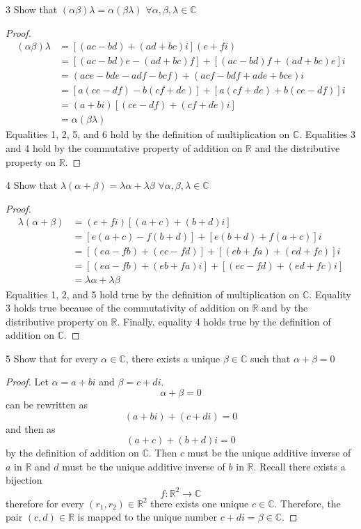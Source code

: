 \documentclass[12pt]{article}
\newenvironment{problem}[1]{\begin{prob*}{#1}{}}{\end{prob*}}
\begin{document}
\begin{problem}{3}
Show that $(\alpha\beta)\lambda =\alpha(\beta \lambda)$ $\forall \alpha,\beta,\lambda \in \mathbb{C}$
\end{problem}
\begin{proof}
    \begin{align*}
        (\alpha\beta)\lambda &=[(ac-bd)+(ad+bc)i](e+fi)\\
        &= [(ac-bd)e-(ad+bc)f]+[(ac-bd)f+(ad+bc)e]i\\
        &= (ace-bde-adf-bcf) +(acf-bdf+ade+bce)i\\
        &= [a(ce-df)-b(cf+de)]+[a(cf+de)+b(ce-df)]i\\
        &= (a+bi)[(ce-df)+(cf+de)i]\\
        &= \alpha(\beta\lambda) 
    \end{align*}
    Equalities 1, 2, 5, and 6 hold by the definition of multiplication on $\mathbb{C}$. Equalities 3 and 4 hold by the commutative property of addition on $\mathbb{R}$ and the distributive property on $\mathbb{R}$.
\end{proof}

\begin{problem}{4}
Show that $\lambda(\alpha + \beta) = \lambda\alpha + \lambda\beta$ $\forall \alpha, \beta, \lambda \in \mathbb{C}$
\end{problem}
\begin{proof}
    \begin{align*}
        \lambda(\alpha + \beta) &= (e+fi)[(a+c)+(b+d)i]\\
        &= [e(a+c)-f(b+d)]+[e(b+d)+f(a+c)]i\\
        &=[(ea-fb)+(ec-fd)]+[(eb+fa)+(ed+fc)]i\\
        &=[(ea-fb)+(eb+fa)i]+[(ec-fd)+(ed+fc)i]\\
        &=\lambda\alpha +\lambda\beta
    \end{align*}
    Equalities 1, 2, and 5 hold true by the definition of multiplication on $\mathbb{C}$.
    Equality 3 holds true because of the commutativity of addition on $\mathbb{R}$ and by the distributive property on $\mathbb{R}$. Finally, equality 4 holds true by the definition of addition on $\mathbb{C}$.
\end{proof}

\begin{problem}{5}
Show that for every $\alpha \in \mathbb{C}$, there exists a unique $\beta \in \mathbb{C}$ such that $\alpha + \beta =0$
\end{problem}
\begin{proof}
    Let $\alpha=a + bi$ and $\beta = c+di$. 
    \[\alpha + \beta =0\]
    can be rewritten as
    \[(a+bi)+(c+di)=0\]
    and then as
    \[(a+c)+(b+d)i=0\]
    by the definition of addition on $\mathbb{C}$. Then $c$ must be the unique additive inverse of $a$ in $\mathbb{R}$ and $d$ must be the unique additive inverse of $b$ in $\mathbb{R}$. Recall there exists a bijection
    \[f: \mathbb{R}^2\to \mathbb{C}\]
    therefore for every $(r_1,r_2)\in \mathbb{R}^2$ there exists one unique $c\in \mathbb{C}$. Therefore, the pair $(c,d)\in \mathbb{R}$ is mapped to the unique number $c+di=\beta\in\mathbb{C}$.
\end{proof}
\end{document}

